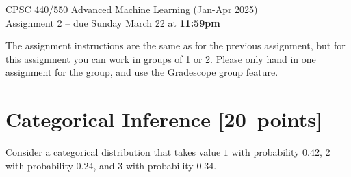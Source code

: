 \documentclass{article}
\newcommand{\pts}[1]{\textcolor{points}{[#1~points]}}
\numberwithin{equation}{section}
\begin{document}
\begin{center}
\Large
CPSC 440/550 Advanced Machine Learning (Jan-Apr 2025)\\
Assignment 2 --
due Sunday March 22 at \textbf{11:59pm}
\end{center}


The assignment instructions are the same as for the previous assignment, but for this assignment you can work in groups of 1 or 2. Please only hand in one assignment for the group, and use the Gradescope group feature.


\section{Categorical Inference \pts{20}}

Consider a categorical distribution that takes value
$1$ with probability $0.42$,
$2$ with probability $0.24$,
and $3$ with probability $0.34$.
\end{document}
